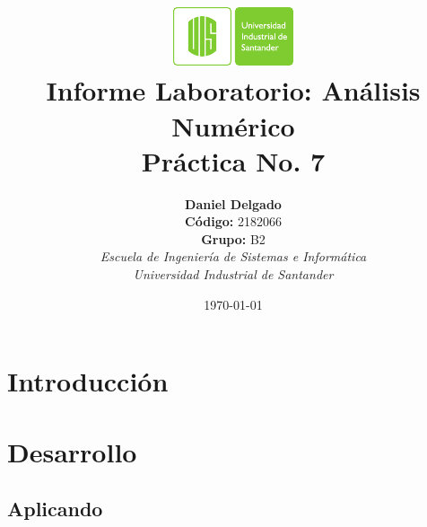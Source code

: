 \documentclass[english,notitlepage,letterpaper, 10pt]{article} %
\newcommand{\university}{\normalsize Universidad Industrial de Santander}
\newcommand{\faculty}{\normalsize  Escuela de Ingenier\'ia de Sistemas e Inform\'atica}
\newcommand{\codigo}{\normalsize  2182066}
\newcommand{\grupo}{\normalsize  B2}
\begin{document}
\title{	\vspace{-12mm}\includegraphics[width=0.2\linewidth]{Logos/UIS.pdf}\\Informe Laboratorio: An\'alisis Num\'erico\\  \centering Pr\'actica No. 7}
\author{
  \textbf{Daniel Delgado} \\ \textbf{C\'odigo:} \codigo\\
  \textbf{Grupo:} \grupo\\
  \textit{\faculty}\\
  \textit{\university}}
\date{\today}
\maketitle

\section{Introducción}


\section{Desarrollo}

\subsection{Aplicando}
\end{document}
